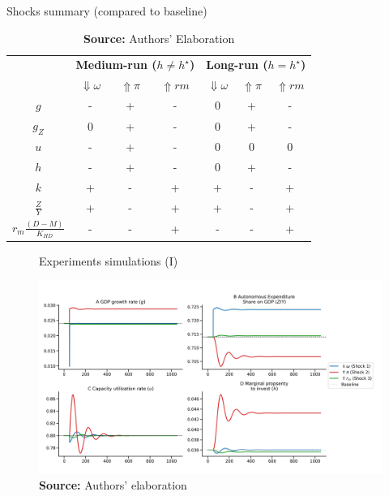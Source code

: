 \documentclass[11pt]{article}
\begin{document}
\begin{table}[H]
	\centering
	\caption{Shocks summary (compared to baseline)}
	\label{ResumoChoques}
		\begin{tabular}{c|c|c|c||c|c|c}
			\hline\hline
			\multirow{2}{*}{} & \multicolumn{3}{c||}{\textbf{Medium-run ($h \neq h^\star$)}} & \multicolumn{3}{c}{\textbf{Long-run ($h = h^\star$)}} \\ \cline{2-7} 
			&  \textbf{$\Downarrow \omega$} & \textbf{$\Uparrow \pi$} & \textbf{$\Uparrow rm$} &  \textbf{$\Downarrow \omega$} & \textbf{$\Uparrow \pi$} & \textbf{$\Uparrow rm$} \\ \hline
			\textbf{$g$}  & - & + & - & 0 & + & - \\ \hline
			\textbf{$g_Z$}  & 0 & + & -  & 0 & + & - \\ \hline
			\textbf{$u$}  & - & + & -  & 0 & 0 & 0 \\ \hline
			\textbf{$h$}  & - & + & -  & 0 & + & - \\ \hline
			\textbf{$k$}  & + & - & +  & + & - & + \\ \hline
			\textbf{$\frac{Z}{Y}$}  & + & - & +  & + & - & + \\ \hline
			\textit{$r_m\frac{(D - M)}{K_{HD}}$}  & - & - & +  & - & - & + \\ \hline\hline
		\end{tabular}%
	\caption*{\textbf{Source:} Authors' Elaboration}
\end{table}


\begin{figure}[htb]
	\centering
	\caption{Experiments simulations (I)}
	\label{fig:results_1}
	\includegraphics[width=.8\textwidth]{./figs/Compared_Shocks_1.png}
	\caption*{\textbf{Source:} Authors' elaboration}
\end{figure}
\end{document}
